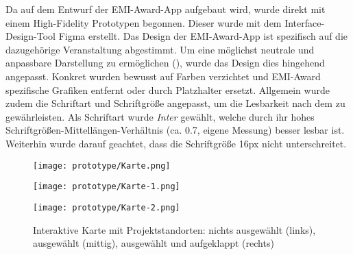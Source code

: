 Da auf dem Entwurf der EMI-Award-App aufgebaut wird, wurde direkt mit einem
High-Fidelity Prototypen begonnen. Dieser wurde mit dem Interface-Design-Tool
Figma erstellt. Das Design der EMI-Award-App ist spezifisch auf die dazugehörige
Veranstaltung abgestimmt. Um eine möglichst neutrale und anpassbare Darstellung
zu ermöglichen (), wurde das Design dies hingehend angepasst.
Konkret wurden bewusst auf Farben verzichtet und EMI-Award spezifische Grafiken
entfernt oder durch Platzhalter ersetzt. Allgemein wurde zudem die Schriftart
und Schriftgröße angepasst, um die Lesbarkeit nach dem \textcite{DBSV2022} zu
gewährleisten. Als Schriftart wurde \textit{Inter} gewählt, welche durch ihr
hohes Schriftgrößen-Mittellängen-Verhältnis (ca. 0.7, eigene Messung) besser
lesbar ist. Weiterhin wurde darauf geachtet, dass die Schriftgröße 16px nicht
unterschreitet.

%

\begin{figure}[htpb]
    \begin{minipage}{.33\textwidth}
        \centering
        \texttt{[image: prototype/Karte.png]}
    \end{minipage}%
    \begin{minipage}{.33\textwidth}
        \centering
        \texttt{[image: prototype/Karte-1.png]}
    \end{minipage}
    \begin{minipage}{.33\textwidth}
        \centering
        \texttt{[image: prototype/Karte-2.png]}
    \end{minipage}
    \caption{Interaktive Karte mit Projektstandorten: nichts ausgewählt (links), ausgewählt (mittig), ausgewählt und aufgeklappt (rechts)}
    \label{fig:prototype-map}
\end{figure}

